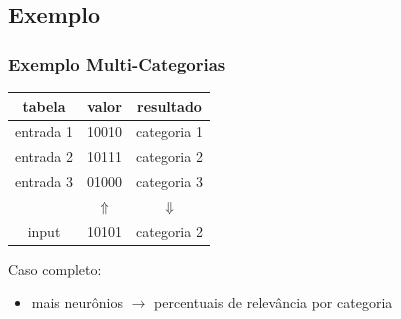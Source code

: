 \documentclass{beamer}
\begin{document}
\subsection{Exemplo}
\begin{frame}
    \frametitle{Exemplo Multi-Categorias}
    \begin{table}
        \centering
        \begin{tabular}{|c|c|c|}
            \hline
            tabela      & valor & resultado\\
            \hline
            entrada 1   & 10010 & categoria 1\\
            \hline
            entrada 2   & 10111 & categoria 2\\
            \hline
            entrada 3   & 01000 & categoria 3\\
            \hline
                        & $\Uparrow$ & $\Downarrow$\\
            \hline
            input       & 10101 & categoria 2\\
            \hline
        \end{tabular}
    \end{table}
    Caso completo:
    \begin{itemize}
        \item mais neurônios $\rightarrow$ percentuais de relevância por categoria
    \end{itemize}
\end{frame}
\end{document}
